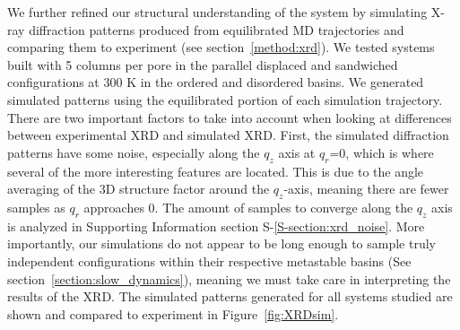 \documentclass[journal=jpcbfk,manuscript=article]{achemso}
\begin{document}
  We further refined our structural understanding of the system by simulating X-ray 
  diffraction patterns produced from equilibrated MD trajectories and comparing them
  to experiment (see section~\ref{method:xrd}). We tested systems built with 5 columns
  per pore in the parallel displaced and sandwiched configurations at 300 K in the 
  ordered and disordered basins. We generated simulated patterns using the equilibrated
  portion of each simulation trajectory. There are two important factors to take into
  account when looking at differences between experimental XRD and simulated XRD. First,
  the simulated diffraction patterns have some noise, especially along the $q_z$ axis 
  at $q_r$=0, which is where several of the more interesting features are located. This
  is due to the angle averaging of the 3D structure factor around the $q_z$-axis, meaning
  there are fewer samples as  $q_r$ approaches 0. The amount of samples to converge along
  the $q_z$ axis is analyzed in Supporting Information section S-\ref{S-section:xrd_noise}. 
  More importantly, our simulations do not appear to be long enough to sample truly 
  independent configurations within their respective metastable basins (See 
  section~\ref{section:slow_dynamics}), meaning we must take care in interpreting the
  results of the XRD. The simulated patterns generated for all systems studied are shown
  and compared to experiment in Figure~\ref{fig:XRDsim}.

\end{document}
